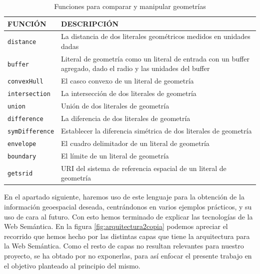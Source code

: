 \begin{table}[H]
	\caption{Funciones para comparar y manipular geometrías}
	\label{funciones-geosparql}
	\centering
	\begin{tabular}{|l|m{8.6cm}|}
		\hline
		\rowcolor[HTML]{EFEFEF} 
		{\textbf{FUNCIÓN} } & {\textbf{DESCRIPCIÓN}} \\ \hline
\texttt{distance}		&       La distancia de dos literales geométricos medidos en unidades dadas                  \\ \hline
\texttt{buffer} &           Literal de geometría como un literal de entrada con un buffer agregado, dado el radio y las unidades del buffer              \\ \hline
	\texttt{convexHull}	&      El casco convexo de un literal de geometría                   \\ \hline
\texttt{intersection} &          La intersección de dos literales de geometría               \\ \hline
\texttt{union}		&     Unión de dos literales de geometría                    \\ \hline
\texttt{difference} &       La diferencia de dos literales de geometría                  \\ \hline
	\texttt{symDifference}	&      Establecer la diferencia simétrica de dos literales de geometría                  \\ \hline
\texttt{envelope}  &              El cuadro delimitador de un literal de geometría           \\ \hline
\texttt{boundary}		&    El límite de un literal de geometría                     \\ \hline
\texttt{getsrid} &       URI del sistema de referencia espacial de un literal de geometría                  \\ \hline		
	\end{tabular}
\end{table}

En el apartado siguiente, haremos uso de este lenguaje para la obtención de la información geoespacial deseada, centrándonos en varios ejemplos prácticos, y su uso de cara al futuro. Con esto hemos terminado de explicar las tecnologías de la Web Semántica. En la figura \ref{fig:arquitectura2copia} podemos apreciar el recorrido que hemos hecho por las distintas capas que tiene la arquitectura para la Web Semántica. Como el resto de capas no resultan relevantes para nuestro proyecto, se ha obtado por no exponerlas, para así enfocar el presente trabajo en el objetivo planteado al principio del mismo.

